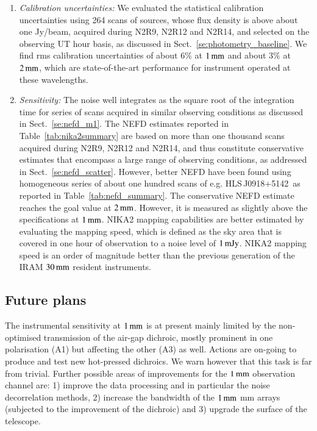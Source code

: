 \documentclass{aa}
\newcommand{\hls}{HLS\,J0918+5142}
\begin{document}
\begin{enumerate}
\item \emph{Calibration uncertainties:} We evaluated the statistical calibration uncertainties using 264 
  scans of sources, whose flux density is above about one Jy/beam,
  acquired during N2R9, N2R12 and N2R14, and selected on the observing UT hour basis, as discussed in
  Sect.~\ref{se:photometry_baseline}. We find rms calibration
  uncertainties of about $6\%$ at $1\,\rm{mm}$ and about $3\%$ at
  $2\,\rm{mm}$, which are state-of-the-art performance for instrument
  operated at these wavelengths. 
  

\item \emph{Sensitivity:} The noise well integrates as the square root of the integration time
  for series of scans acquired in similar observing conditions as
  discussed in Sect.~\ref{se:nefd_m1}. The NEFD estimates reported in
  Table~\ref{tab:nika2summary} are based on more than one thousand scans
  acquired during N2R9, N2R12 and N2R14, and thus constitute
  conservative estimates that encompass a large range of observing
  conditions, as addressed in Sect.~\ref{se:nefd_scatter}. However,
  better NEFD have been found using homogeneous series of about one
  hundred scans of e.g. \hls\, as reported in
  Table~\ref{tab:nefd_summary}.  The conservative NEFD estimate reaches
  the goal value at $2\,\rm{mm}$. However, it is measured as slightly
  above the specifications at $1\,\rm{mm}$.
  NIKA2 mapping capabilities are better estimated by evaluating the
  mapping speed, which is defined as the sky area that is covered in one
  hour of observation to a noise level of $1\,\rm{mJy}$. NIKA2 mapping
  speed is an order of magnitude better than the previous generation of
  the IRAM $30\,\rm{mm}$ resident instruments. 
\end{enumerate}

\subsection*{Future plans}
The instrumental sensitivity at $1\,\rm{mm}$ is at present mainly
limited by the non-optimised transmission of the air-gap dichroic,
mostly prominent in one polarisation (A1) but affecting the other
(A3) as well. Actions are on-going to produce and test new
hot-pressed dichroics. We warn however that this task is far from
trivial.
Further possible areas of improvements for the $1\,\rm{mm}$
observation channel are: 1) improve the data processing and in
particular the noise decorrelation methods, 2) increase the
bandwidth of the $1\,\rm{mm}$ mm arrays (subjected to the
improvement of the dichroic) and 3) upgrade the surface of the
telescope.
  
\end{document}
